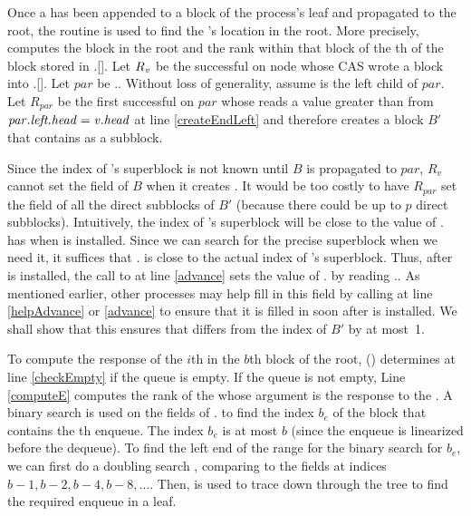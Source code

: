 Once a  has been appended to a block of the process's leaf and propagated to the root,
the  routine is used to find the 's location in the root.
More precisely, 
computes the block in the root and the rank
within that block  of the th  of the block  stored in .[].
Let $R\textsubscript{\mbox{\textnormal{\textit{v}}}}$ be the successful  on node 
whose CAS wrote a block  into .[].
Let $par$ be .. Without loss of generality, assume 
 is the left child of $par$. Let
$R_{par}$ be the first successful  on $par$ whose  reads a
value greater than  from $\mbox{\textnormal{\textit{par}}}.\mbox{\textit{left.head}}=\mbox{\textnormal{\textit{v}}}.\mbox{\textit{head}}$ at line \ref{createEndLeft} and therefore creates a block $B'$ that contains
 as a subblock. 
 
Since the index of 's superblock is not known until $B$ is
propagated to $par$, $R_v$ cannot set the  field of ${B}$ when
it creates . 
It would be too costly to have $R_{par}$ set the  field of all the direct subblocks of $B'$ (because
there could be up to $p$ direct subblocks).
Intuitively, the index of 's superblock will be close to the value of . has when  is installed.
Since we can search for the precise superblock when we need it, it suffices that .
is close to the actual index of 's superblock.
Thus, after  is installed, the call to  at line \ref{advance} sets the value of . by reading ..
As mentioned earlier, other processes may help fill in this field by calling  at line \ref{helpAdvance} or \ref{advance} to ensure that it is filled in soon after  is installed.
We shall
show that this ensures that  differs
from the index of $B'$ by at most~1. 

To compute the response of the $i$th  in the $b$th block
of the root, () determines at line \ref{checkEmpty} if the queue is empty.
If the queue is
not empty, Line \ref{computeE} computes the rank  of the
 whose argument is the response to the
. 
A binary search is used on the  fields of . to find the index $b_e$ of the block that contains 
the th enqueue.
The index $b_e$ is at most $b$ (since the enqueue is linearized before the dequeue).  To find the left end of the range for the binary search for $b_e$, we can first do a doubling search \cite{BY76}, comparing  to the  fields at indices $b-1, b-2, b-4, b-8, \ldots$.
Then,  is used to trace down through the tree to find the required enqueue in a leaf.

